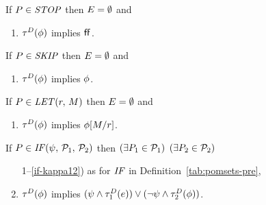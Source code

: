 \begin{definition}
  If $\aPS\SB0\in\sSTOP$ then $\aEvs\SB0 = \emptyset$ and
  \begin{enumerate}
  \item $\aTr[\bEvs]\SB0(\aForm)$ implies $\FALSE$.
  \end{enumerate}

  \noindent
  If $\aPS\SB0\in\sSKIP$ then $\aEvs\SB0 = \emptyset$ and
  \begin{enumerate}
  \item $\aTr[\bEvs]\SB0(\aForm)$ implies $\aForm$.
  \end{enumerate}

  \noindent
  If $\aPS\SB0\in\sLET{\aReg}{\aExp}$ then $\aEvs\SB0 = \emptyset$ and
  \begin{enumerate}
  \item $\aTr[\bEvs]\SB0(\aForm)$ implies $\aForm[\aExp/\aReg]$.
  \end{enumerate}

  \noindent
  If $\aPS\SB0 \in \sIF{\bForm}\sTHEN\aPSS_1\sELSE\aPSS_2\sFI$ then
  $(\exists\aPS_1\in\aPSS_1)$ $(\exists\aPS_2\in\aPSS_2)$
  \begin{enumerate}
    \setcounter{enumi}{\value{pomsetPreIfCount}}
  \item[1--\ref{if-kappa12})] as for $\sIF{}$ in Definition~\ref{tab:pomsets-pre},
  \item \label{if-tau}
    $\aTr[\bEvs]\SB0(\aForm)$ implies $(\bForm\land\aTr[\bEvs]_1(\aEv))\lor(\neg\bForm\land\aTr[\bEvs]_2(\aForm))$.
  \end{enumerate}


\end{definition}
